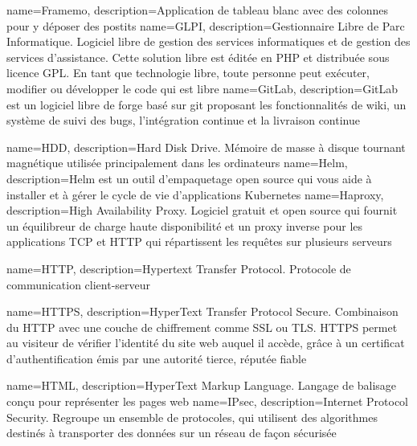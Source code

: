 {
    name=Framemo,
    description={Application de tableau blanc avec des colonnes pour y déposer des postits}
}
{
    name=GLPI,
    description={Gestionnaire Libre de Parc Informatique. Logiciel libre de gestion des services informatiques et de gestion des services d'assistance. Cette solution libre est éditée en PHP et distribuée sous licence GPL. En tant que technologie libre, toute personne peut exécuter, modifier ou développer le code qui est libre}
}
{
    name=GitLab,
    description={GitLab est un logiciel libre de forge basé sur git proposant les fonctionnalités de wiki, un système de suivi des bugs, l’intégration continue et la livraison continue}
}

{
    name=HDD,
    description={Hard Disk Drive. Mémoire de masse à disque tournant magnétique utilisée principalement dans les ordinateurs}
}
{
    name=Helm,
    description={Helm est un outil d'empaquetage open source qui vous aide à installer et à gérer le cycle de vie d'applications Kubernetes}
}
{
    name=Haproxy,
    description={High Availability Proxy. Logiciel gratuit et open source qui fournit un équilibreur de charge haute disponibilité et un proxy inverse pour les applications TCP et HTTP qui répartissent les requêtes sur plusieurs serveurs}
}

{
    name=HTTP,
    description={Hypertext Transfer Protocol. Protocole de communication client-serveur}
}

{
    name=HTTPS,
    description={HyperText Transfer Protocol Secure. Combinaison du HTTP avec une couche de chiffrement comme SSL ou TLS. HTTPS permet au visiteur de vérifier l'identité du site web auquel il accède, grâce à un certificat d'authentification émis par une autorité tierce, réputée fiable}
}

{
    name=HTML,
    description={HyperText Markup Language. Langage de balisage conçu pour représenter les pages web}
}
{
    name=IPsec,
    description={Internet Protocol Security. Regroupe un ensemble de protocoles, qui utilisent des algorithmes destinés à transporter des données sur un réseau de façon sécurisée}
}

